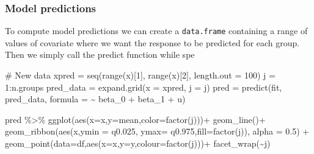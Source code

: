 \documentclass[
  letterpaper,
  DIV=11,
  numbers=noendperiod]{scrartcl}
\newenvironment{Shaded}{\begin{snugshade}}{\end{snugshade}}
\newcommand{\AttributeTok}[1]{\textcolor[rgb]{0.40,0.45,0.13}{#1}}
\newcommand{\CommentTok}[1]{\textcolor[rgb]{0.37,0.37,0.37}{#1}}
\newcommand{\DecValTok}[1]{\textcolor[rgb]{0.68,0.00,0.00}{#1}}
\newcommand{\FloatTok}[1]{\textcolor[rgb]{0.68,0.00,0.00}{#1}}
\newcommand{\FunctionTok}[1]{\textcolor[rgb]{0.28,0.35,0.67}{#1}}
\newcommand{\NormalTok}[1]{\textcolor[rgb]{0.00,0.23,0.31}{#1}}
\newcommand{\OtherTok}[1]{\textcolor[rgb]{0.00,0.23,0.31}{#1}}
\newcommand{\SpecialCharTok}[1]{\textcolor[rgb]{0.37,0.37,0.37}{#1}}
\begin{document}
\subsubsection{Model predictions}\label{model-predictions}

To compute model predictions we can create a \texttt{data.frame}
containing a range of values of covariate where we want the response to
be predicted for each group. Then we simply call the predict function
while spe

\begin{Shaded}
\begin{Highlighting}[]
\CommentTok{\# New data}
\NormalTok{xpred }\OtherTok{=} \FunctionTok{seq}\NormalTok{(}\FunctionTok{range}\NormalTok{(x)[}\DecValTok{1}\NormalTok{], }\FunctionTok{range}\NormalTok{(x)[}\DecValTok{2}\NormalTok{], }\AttributeTok{length.out =} \DecValTok{100}\NormalTok{)}
\NormalTok{j }\OtherTok{=} \DecValTok{1}\SpecialCharTok{:}\NormalTok{n.groups}
\NormalTok{pred\_data }\OtherTok{=} \FunctionTok{expand.grid}\NormalTok{(}\AttributeTok{x =}\NormalTok{ xpred, }\AttributeTok{j =}\NormalTok{ j)}
\NormalTok{pred }\OtherTok{=} \FunctionTok{predict}\NormalTok{(fit, pred\_data, }\AttributeTok{formula =} \SpecialCharTok{\textasciitilde{}}\NormalTok{ beta\_0 }\SpecialCharTok{+}\NormalTok{ beta\_1 }\SpecialCharTok{+}\NormalTok{ u) }


\NormalTok{pred }\SpecialCharTok{\%\textgreater{}\%}
  \FunctionTok{ggplot}\NormalTok{(}\FunctionTok{aes}\NormalTok{(}\AttributeTok{x=}\NormalTok{x,}\AttributeTok{y=}\NormalTok{mean,}\AttributeTok{color=}\FunctionTok{factor}\NormalTok{(j)))}\SpecialCharTok{+}
  \FunctionTok{geom\_line}\NormalTok{()}\SpecialCharTok{+}
  \FunctionTok{geom\_ribbon}\NormalTok{(}\FunctionTok{aes}\NormalTok{(x,}\AttributeTok{ymin =}\NormalTok{ q0}\FloatTok{.025}\NormalTok{, }\AttributeTok{ymax=}\NormalTok{ q0}\FloatTok{.975}\NormalTok{,}\AttributeTok{fill=}\FunctionTok{factor}\NormalTok{(j)), }\AttributeTok{alpha =} \FloatTok{0.5}\NormalTok{) }\SpecialCharTok{+} 
  \FunctionTok{geom\_point}\NormalTok{(}\AttributeTok{data=}\NormalTok{df,}\FunctionTok{aes}\NormalTok{(}\AttributeTok{x=}\NormalTok{x,}\AttributeTok{y=}\NormalTok{y,}\AttributeTok{colour=}\FunctionTok{factor}\NormalTok{(j)))}\SpecialCharTok{+}
  \FunctionTok{facet\_wrap}\NormalTok{(}\SpecialCharTok{\textasciitilde{}}\NormalTok{j)}
\end{Highlighting}
\end{Shaded}
\end{document}
